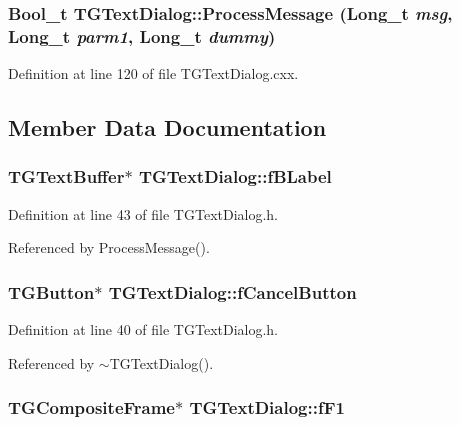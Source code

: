 \subsubsection[{ProcessMessage}]{\setlength{\rightskip}{0pt plus 5cm}Bool\_\-t TGTextDialog::ProcessMessage (Long\_\-t {\em msg}, \/  Long\_\-t {\em parm1}, \/  Long\_\-t {\em dummy})\hspace{0.3cm}{\ttfamily  [virtual]}}\label{classTGTextDialog_a8fc637de9244272ad8a37e50726d4c5e}


Definition at line 120 of file TGTextDialog.cxx.

\subsection{Member Data Documentation}
\subsubsection[{fBLabel}]{\setlength{\rightskip}{0pt plus 5cm}TGTextBuffer$\ast$ {\bf TGTextDialog::fBLabel}\hspace{0.3cm}{\ttfamily  [protected]}}\label{classTGTextDialog_a6c128e468d74f6fcd346725c638e999b}


Definition at line 43 of file TGTextDialog.h.

Referenced by ProcessMessage().
\subsubsection[{fCancelButton}]{\setlength{\rightskip}{0pt plus 5cm}TGButton$\ast$ {\bf TGTextDialog::fCancelButton}\hspace{0.3cm}{\ttfamily  [protected]}}\label{classTGTextDialog_a02c754484583115ea33e2f5d97af3640}


Definition at line 40 of file TGTextDialog.h.

Referenced by $\sim$TGTextDialog().
\subsubsection[{fF1}]{\setlength{\rightskip}{0pt plus 5cm}TGCompositeFrame$\ast$ {\bf TGTextDialog::fF1}\hspace{0.3cm}{\ttfamily  [protected]}}\label{classTGTextDialog_a27e4ebcf1556be894db3042f9557efc1}


